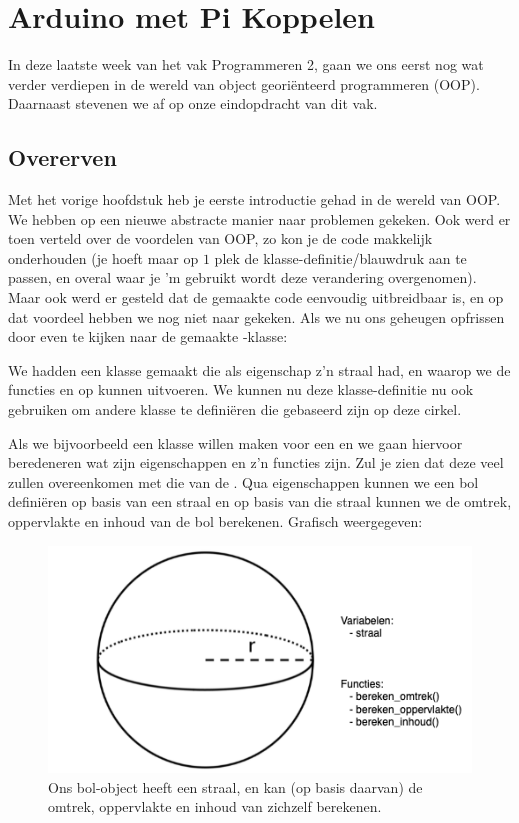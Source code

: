 \chapter{Arduino met Pi Koppelen}

In deze laatste week van het vak Programmeren 2, gaan we ons eerst nog wat verder verdiepen in de wereld van object georiënteerd programmeren (OOP). Daarnaast stevenen we af op onze eindopdracht van dit vak.

\section{Overerven}
Met het vorige hoofdstuk heb je eerste introductie gehad in de wereld van OOP. We hebben op een nieuwe abstracte manier naar problemen gekeken. Ook werd er toen verteld over de voordelen van OOP, zo kon je de code makkelijk onderhouden (je hoeft maar op $1$ plek de klasse-definitie/blauwdruk aan te passen, en overal waar je 'm gebruikt wordt deze verandering overgenomen). Maar ook werd er gesteld dat de gemaakte code eenvoudig uitbreidbaar is, en op dat voordeel hebben we nog niet naar gekeken. Als we nu ons geheugen opfrissen door even te kijken naar de gemaakte -klasse:


We hadden een klasse  gemaakt die als eigenschap z'n straal had, en waarop we de functies  en  op kunnen uitvoeren. We kunnen nu deze klasse-definitie nu ook gebruiken om andere klasse te definiëren die gebaseerd zijn op deze cirkel.  

Als we bijvoorbeeld een klasse willen maken voor een  en we gaan hiervoor beredeneren wat zijn eigenschappen en z'n functies zijn. Zul je zien dat deze veel zullen overeenkomen met die van de . Qua eigenschappen kunnen we een bol definiëren op basis van een straal en op basis van die straal kunnen we de omtrek, oppervlakte en inhoud van de bol berekenen. Grafisch weergegeven:
\begin{figure}[h!]
\centering\includegraphics[scale=0.7]{Pictures/chapter08/bol.png}
\caption{\small Ons bol-object heeft een straal, en kan (op basis daarvan) de omtrek, oppervlakte en inhoud van zichzelf berekenen.}
\label{fig:bol} %
\end{figure}

